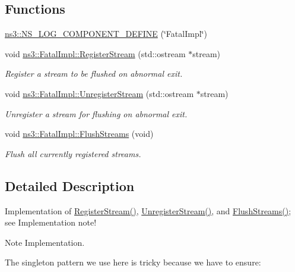 \subsection*{Functions}
\begin{DoxyCompactItemize}
\item 
\hyperlink{namespacens3_aef38fba055d587c1ab583048e948f157}{ns3\+::\+N\+S\+\_\+\+L\+O\+G\+\_\+\+C\+O\+M\+P\+O\+N\+E\+N\+T\+\_\+\+D\+E\+F\+I\+NE} (\char`\"{}Fatal\+Impl\char`\"{})
\item 
void \hyperlink{group__fatalimpl_gad552ca3d6d85b95147b8c6a2eb4d4579}{ns3\+::\+Fatal\+Impl\+::\+Register\+Stream} (std\+::ostream $\ast$stream)
\begin{DoxyCompactList}\small\item\em Register a stream to be flushed on abnormal exit. \end{DoxyCompactList}\item 
void \hyperlink{group__fatalimpl_ga2bf70e98e990f01912527b4ccfac27d0}{ns3\+::\+Fatal\+Impl\+::\+Unregister\+Stream} (std\+::ostream $\ast$stream)
\begin{DoxyCompactList}\small\item\em Unregister a stream for flushing on abnormal exit. \end{DoxyCompactList}\item 
void \hyperlink{group__fatalimpl_gad96fb19ef26235aaccd15e6d2a72382f}{ns3\+::\+Fatal\+Impl\+::\+Flush\+Streams} (void)
\begin{DoxyCompactList}\small\item\em Flush all currently registered streams. \end{DoxyCompactList}\end{DoxyCompactItemize}


\subsection{Detailed Description}
Implementation of \hyperlink{group__fatalimpl_gad552ca3d6d85b95147b8c6a2eb4d4579}{Register\+Stream()}, \hyperlink{group__fatalimpl_ga2bf70e98e990f01912527b4ccfac27d0}{Unregister\+Stream()}, and \hyperlink{group__fatalimpl_gad96fb19ef26235aaccd15e6d2a72382f}{Flush\+Streams()}; see Implementation note! 

\begin{DoxyNote}{Note}
Implementation.
\end{DoxyNote}
The singleton pattern we use here is tricky because we have to ensure\+:


